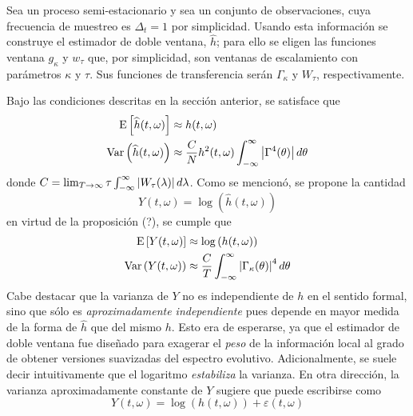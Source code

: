 Sea \xt un proceso semi-estacionario y sea \xtd un conjunto de observaciones, cuya frecuencia de 
muestreo es $\Delta_t=1$ por simplicidad.
%
Usando esta información se construye el estimador de doble ventana, $\widehat{h}$; para ello se eligen las funciones ventana $g_\kappa$ y $w_\tau$ que, por simplicidad, son ventanas de escalamiento con parámetros $\kappa$ y $\tau$. Sus funciones de transferencia serán $\Gamma_\kappa$ y $W_\tau$, respectivamente.

Bajo las condiciones descritas en la sección anterior, se satisface que
%
\begin{align*}
\mathrm{E}\left[ \widehat{h}(t,\omega) \right] &\approx h(t,\omega) \\
\mathrm{Var}\left( \widehat{h}(t,\omega) \right) &\approx \frac{C}{N} h^{2}(t,\omega) \int_{-\infty}^{\infty} \left| \Gamma^{4}(\theta) \right| d\theta
\end{align*}
%
donde $C = \lim_{T\rightarrow \infty} \tau \int_{-\infty}^{\infty} \left| W_\tau(\lambda) \right| d\lambda$.
%
Como se mencionó, se propone la cantidad 
\begin{equation}
Y(t,\omega) = \log\left(\widehat{h}(t,\omega)\right)
\end{equation}
en virtud de la proposición (?), se cumple que
\begin{align}
\mathrm{E}\left[ Y(t,\omega) \right] &\approx \log\left(h(t,\omega)\right) \\
\mathrm{Var}\left( Y(t,\omega) \right) &\approx \frac{C}{T} \int_{-\infty}^{\infty} \left| \Gamma_\kappa(\theta) \right|^{4} d\theta \\
\end{align}
Cabe destacar que la varianza de $Y$ no es independiente de $h$ en el sentido formal, sino que 
sólo es \textit{aproximadamente independiente} pues depende en mayor medida de la forma de 
$\widehat{h}$ que del mismo $h$.
%
Esto era de esperarse, ya que el estimador de doble ventana fue diseñado para exagerar el \textit{peso} de la información local al grado de obtener versiones suavizadas del espectro evolutivo. 
%
Adicionalmente, se suele decir intuitivamente que el logaritmo \textit{estabiliza} la varianza. 
%
En otra dirección, la varianza aproximadamente constante de $Y$ sugiere que puede escribirse como
\begin{equation}
Y(t,\omega) = \log\left(h(t,\omega) \right) + \varepsilon(t,\omega)
\label{ye}
\end{equation}

